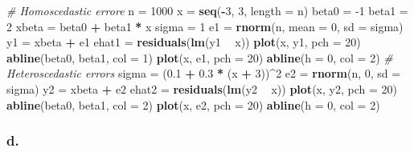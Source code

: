 \documentclass[]{article}
\newenvironment{Shaded}{\begin{snugshade}}{\end{snugshade}}
\newcommand{\KeywordTok}[1]{\textcolor[rgb]{0.13,0.29,0.53}{\textbf{#1}}}
\newcommand{\DataTypeTok}[1]{\textcolor[rgb]{0.13,0.29,0.53}{#1}}
\newcommand{\DecValTok}[1]{\textcolor[rgb]{0.00,0.00,0.81}{#1}}
\newcommand{\FloatTok}[1]{\textcolor[rgb]{0.00,0.00,0.81}{#1}}
\newcommand{\StringTok}[1]{\textcolor[rgb]{0.31,0.60,0.02}{#1}}
\newcommand{\CommentTok}[1]{\textcolor[rgb]{0.56,0.35,0.01}{\textit{#1}}}
\newcommand{\OperatorTok}[1]{\textcolor[rgb]{0.81,0.36,0.00}{\textbf{#1}}}
\newcommand{\NormalTok}[1]{#1}
\begin{document}
\begin{Shaded}
\begin{Highlighting}[]
\CommentTok{# Homoscedastic errore}
\NormalTok{n =}\StringTok{ }\DecValTok{1000}
\NormalTok{x =}\StringTok{ }\KeywordTok{seq}\NormalTok{(}\OperatorTok{-}\DecValTok{3}\NormalTok{, }\DecValTok{3}\NormalTok{, }\DataTypeTok{length =}\NormalTok{ n)}
\NormalTok{beta0 =}\StringTok{ }\DecValTok{-1}
\NormalTok{beta1 =}\StringTok{ }\DecValTok{2}
\NormalTok{xbeta =}\StringTok{ }\NormalTok{beta0 }\OperatorTok{+}\StringTok{ }\NormalTok{beta1 }\OperatorTok{*}\StringTok{ }\NormalTok{x}
\NormalTok{sigma =}\StringTok{ }\DecValTok{1}
\NormalTok{e1 =}\StringTok{ }\KeywordTok{rnorm}\NormalTok{(n, }\DataTypeTok{mean =} \DecValTok{0}\NormalTok{, }\DataTypeTok{sd =}\NormalTok{ sigma)}
\NormalTok{y1 =}\StringTok{ }\NormalTok{xbeta }\OperatorTok{+}\StringTok{ }\NormalTok{e1}
\NormalTok{ehat1 =}\StringTok{ }\KeywordTok{residuals}\NormalTok{(}\KeywordTok{lm}\NormalTok{(y1 }\OperatorTok{~}\StringTok{ }\NormalTok{x))}
\KeywordTok{plot}\NormalTok{(x, y1, }\DataTypeTok{pch =} \DecValTok{20}\NormalTok{)}
\KeywordTok{abline}\NormalTok{(beta0, beta1, }\DataTypeTok{col =} \DecValTok{1}\NormalTok{)}
\KeywordTok{plot}\NormalTok{(x, e1, }\DataTypeTok{pch =} \DecValTok{20}\NormalTok{)}
\KeywordTok{abline}\NormalTok{(}\DataTypeTok{h =} \DecValTok{0}\NormalTok{, }\DataTypeTok{col =} \DecValTok{2}\NormalTok{)}
\CommentTok{# Heteroscedastic errors}
\NormalTok{sigma =}\StringTok{ }\NormalTok{(}\FloatTok{0.1} \OperatorTok{+}\StringTok{ }\FloatTok{0.3} \OperatorTok{*}\StringTok{ }\NormalTok{(x }\OperatorTok{+}\StringTok{ }\DecValTok{3}\NormalTok{))}\OperatorTok{^}\DecValTok{2}
\NormalTok{e2 =}\StringTok{ }\KeywordTok{rnorm}\NormalTok{(n, }\DecValTok{0}\NormalTok{, }\DataTypeTok{sd =}\NormalTok{ sigma)}
\NormalTok{y2 =}\StringTok{ }\NormalTok{xbeta }\OperatorTok{+}\StringTok{ }\NormalTok{e2}
\NormalTok{ehat2 =}\StringTok{ }\KeywordTok{residuals}\NormalTok{(}\KeywordTok{lm}\NormalTok{(y2 }\OperatorTok{~}\StringTok{ }\NormalTok{x))}
\KeywordTok{plot}\NormalTok{(x, y2, }\DataTypeTok{pch =} \DecValTok{20}\NormalTok{)}
\KeywordTok{abline}\NormalTok{(beta0, beta1, }\DataTypeTok{col =} \DecValTok{2}\NormalTok{)}
\KeywordTok{plot}\NormalTok{(x, e2, }\DataTypeTok{pch =} \DecValTok{20}\NormalTok{)}
\KeywordTok{abline}\NormalTok{(}\DataTypeTok{h =} \DecValTok{0}\NormalTok{, }\DataTypeTok{col =} \DecValTok{2}\NormalTok{)}
\end{Highlighting}
\end{Shaded}

\subsubsection{d.}\label{d.}
\end{document}
